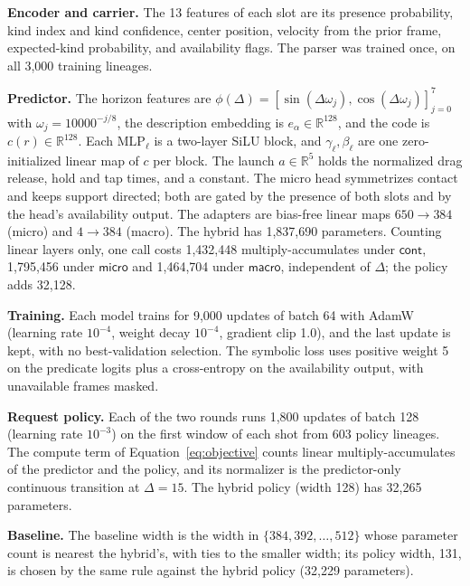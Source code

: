 \subsubsection{\texorpdfstring{}{Implementation Details of the Submitted Model}}
\label{sec:app:impl}

\textbf{Encoder and carrier.} The 13 features of each slot are its presence probability, kind index and kind confidence, center position, velocity from the prior frame, expected-kind probability, and availability flags. The parser was trained once, on all 3,000 training lineages.

\textbf{Predictor.} The horizon features are $\phi(\Delta)=[\sin(\Delta\omega_j),\cos(\Delta\omega_j)]_{j=0}^{7}$ with $\omega_j=10000^{-j/8}$, the description embedding is $e_\alpha\in\mathbb{R}^{128}$, and the code is $c(r)\in\mathbb{R}^{128}$. Each $\mathrm{MLP}_\ell$ is a two-layer SiLU block, and $\gamma_\ell,\beta_\ell$ are one zero-initialized linear map of $c$ per block. The launch $a\in\mathbb{R}^5$ holds the normalized drag release, hold and tap times, and a constant. The micro head symmetrizes contact and keeps support directed; both are gated by the presence of both slots and by the head's availability output. The adapters are bias-free linear maps $650\to384$ (micro) and $4\to384$ (macro). The hybrid has 1,837,690 parameters. Counting linear layers only, one call costs 1,432,448 multiply-accumulates under $\textsf{cont}$, 1,795,456 under $\textsf{micro}$ and 1,464,704 under $\textsf{macro}$, independent of $\Delta$; the policy adds 32,128.

\textbf{Training.} Each model trains for 9,000 updates of batch 64 with AdamW (learning rate $10^{-4}$, weight decay $10^{-4}$, gradient clip 1.0), and the last update is kept, with no best-validation selection. The symbolic loss uses positive weight 5 on the predicate logits plus a cross-entropy on the availability output, with unavailable frames masked.

\textbf{Request policy.} Each of the two rounds runs 1,800 updates of batch 128 (learning rate $10^{-3}$) on the first window of each shot from 603 policy lineages. The compute term of Equation~\ref{eq:objective} counts linear multiply-accumulates of the predictor and the policy, and its normalizer is the predictor-only continuous transition at $\Delta=15$. The hybrid policy (width 128) has 32,265 parameters.

\textbf{Baseline.} The baseline width is the width in $\{384,392,\dots,512\}$ whose parameter count is nearest the hybrid's, with ties to the smaller width; its policy width, 131, is chosen by the same rule against the hybrid policy (32,229 parameters). 

